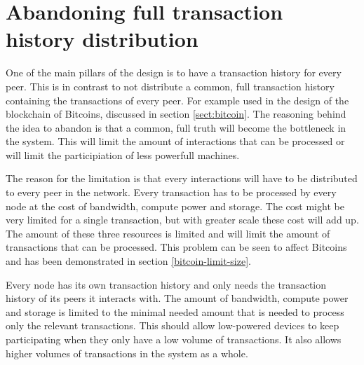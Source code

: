 \section{Abandoning full transaction history distribution}
One of the main pillars of the design is to have a transaction history for every peer.
This is in contrast to not distribute a common, full transaction history containing the transactions of every peer.
For example used in the design of the blockchain of Bitcoins, discussed in section \ref{sect:bitcoin}.
The reasoning behind the idea to abandon is that a common, full truth
will become the bottleneck in the system.
This will limit the amount of interactions that can be processed
or will limit the participiation of less powerfull machines.

The reason for the limitation is that every interactions will have to be distributed to every peer in the network.
Every transaction has to be processed by every node at the cost of bandwidth, compute power and storage.
The cost might be very limited for a single transaction,
but with greater scale these cost will add up.
The amount of these three resources is limited and will limit the amount of transactions that can be processed.
This problem can be seen to affect Bitcoins and has been demonstrated in section \ref{bitcoin-limit-size}.

Every node has its own transaction history and only needs the transaction history of its peers it interacts with.
The amount of bandwidth, compute power and storage is limited to the minimal needed amount
that is needed to process only the relevant transactions.
This should allow low-powered devices to keep participating when they only have a low volume of transactions.
It also allows higher volumes of transactions in the system as a whole.